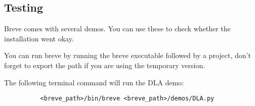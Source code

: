 \subsection{Testing}
	Breve comes with several demos. You can use these to check whether the installation went okay. 

	You can run breve by running the breve executable followed by a project, don't forget to export the path if you are using the temporary version.
	
	The following terminal command will run the DLA demo:
	\begin{verbatim}
		  <breve_path>/bin/breve <breve_path>/demos/DLA.py
	\end{verbatim}

